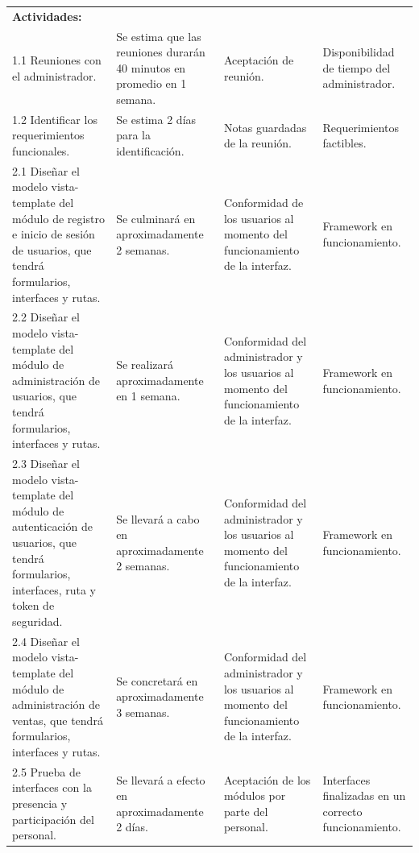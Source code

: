 \documentclass[12pt,letterpaper]{article}
\begin{document}
\begin{spacing}{1.1}
\begin{longtable}{| m{5.3cm} | m{2.9cm} | m{3.4cm} | m{3.4cm} | }
		\textbf{Actividades:} & & & \\		
		1.1 Reuniones con el administrador.	& Se estima que las reuniones durarán 40 minutos en promedio en 1 semana. & Aceptación de reunión. & Disponibilidad de tiempo del administrador.\\
		\hline
		1.2 Identificar los requerimientos funcionales. & Se estima 2 días para la identificación. & Notas guardadas de la reunión. & Requerimientos factibles.\\
		\hline				
		2.1 Diseñar el modelo vista-template del módulo de registro e inicio de sesión de usuarios, que tendrá formularios, interfaces y rutas. & Se culminará en aproximadamente 2 semanas. & Conformidad de los
		usuarios al momento del funcionamiento de la interfaz. & Framework en
		funcionamiento.\\
		\hline
		2.2 Diseñar el modelo vista-template del módulo de administración de usuarios, que tendrá formularios, interfaces y rutas. & Se realizará
		aproximadamente en 1 semana. & Conformidad del administrador y los
		usuarios al momento del funcionamiento de la interfaz. & Framework en
		funcionamiento. \\
		\hline
		2.3 Diseñar el modelo vista-template del módulo de autenticación de usuarios, que tendrá formularios, interfaces, ruta y token de seguridad. & Se llevará a cabo en aproximadamente 2 semanas. & Conformidad del administrador y los usuarios al momento del funcionamiento de la interfaz. & Framework en funcionamiento. \\
		\hline
		2.4 Diseñar el modelo vista-template del módulo de administración de
		ventas, que tendrá formularios, interfaces y rutas. & Se concretará en aproximadamente 3 semanas. & Conformidad del  administrador y los usuarios al momento del funcionamiento de la interfaz. & Framework en funcionamiento.\\
		\hline
		2.5 Prueba de interfaces con la presencia y participación del personal. & Se llevará a efecto en aproximadamente 2 días. & Aceptación de los módulos por parte del personal. & Interfaces finalizadas en un correcto funcionamiento. \\
		\hline
		

\end{longtable}
\end{spacing}
\end{document}
